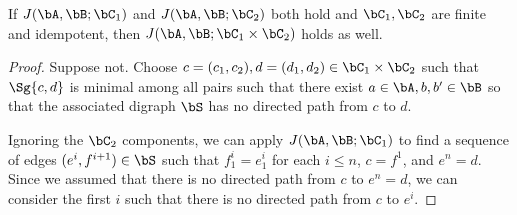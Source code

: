 \begin{lem} If $J(\bA,\bB;\bC_1)$ and $J(\bA,\bB;\bC_2)$ both hold and $\bC_1, \bC_2$ are finite and idempotent, then $J(\bA,\bB;\bC_1\times\bC_2)$ holds as well.
\end{lem}
\begin{proof} Suppose not. Choose $c = (c_1,c_2), d = (d_1,d_2) \in \bC_1 \times \bC_2$ such that $\Sg\{c,d\}$ is minimal among all pairs such that there exist $a \in \bA, b, b' \in \bB$ so that the associated digraph $\bS$ has no directed path from $c$ to $d$.

Ignoring the $\bC_2$ components, we can apply $J(\bA,\bB;\bC_1)$ to find a sequence of edges $(e^i,f^{i+1}) \in \bS$ such that $f^i_1 = e^i_1$ for each $i \le n$, $c = f^1$, and $e^n = d$. Since we assumed that there is no directed path from $c$ to $e^n = d$, we can consider the first $i$ such that there is no directed path from $c$ to $e^i$.


\end{proof}
